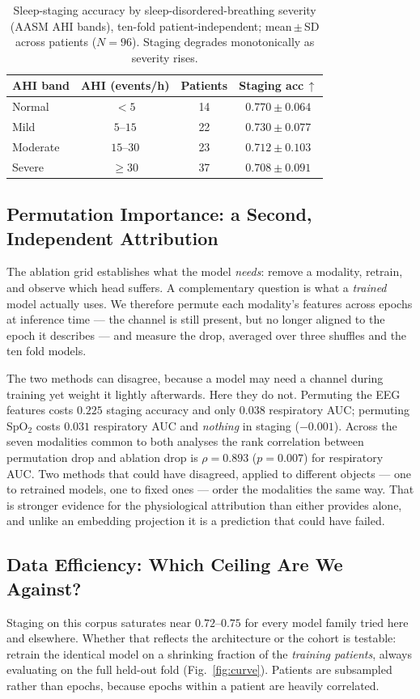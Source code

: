 \documentclass[journal]{IEEEtran}
\begin{document}
\begin{table}[t]
\caption{Sleep-staging accuracy by sleep-disordered-breathing severity (AASM AHI bands),
ten-fold patient-independent; mean\,$\pm$\,SD across patients ($N=96$). Staging degrades
monotonically as severity rises.}
\label{tab:severity}
\centering
\small
\begin{tabular}{lccc}
\toprule
AHI band & AHI (events/h) & Patients & Staging acc\,$\uparrow$ \\
\midrule
Normal   & $<5$       & 14 & $0.770 \pm 0.064$ \\
Mild     & $5$--$15$  & 22 & $0.730 \pm 0.077$ \\
Moderate & $15$--$30$ & 23 & $0.712 \pm 0.103$ \\
Severe   & $\geq 30$  & 37 & $0.708 \pm 0.091$ \\
\bottomrule
\end{tabular}
\end{table}

\subsection{Permutation Importance: a Second, Independent Attribution}
The ablation grid establishes what the model \emph{needs}: remove a modality, retrain, and
observe which head suffers. A complementary question is what a \emph{trained} model actually
uses. We therefore permute each modality's features across epochs at inference time --- the
channel is still present, but no longer aligned to the epoch it describes --- and measure the
drop, averaged over three shuffles and the ten fold models.

The two methods can disagree, because a model may need a channel during training yet weight it
lightly afterwards. Here they do not. Permuting the EEG features costs $0.225$ staging accuracy
and only $0.038$ respiratory AUC; permuting SpO$_2$ costs $0.031$ respiratory AUC and
\emph{nothing} in staging ($-0.001$). Across the seven modalities common to both analyses the
rank correlation between permutation drop and ablation drop is $\rho=0.893$ ($p=0.007$) for
respiratory AUC. Two methods that could have disagreed, applied to different objects --- one to
retrained models, one to fixed ones --- order the modalities the same way. That is stronger
evidence for the physiological attribution than either provides alone, and unlike an embedding
projection it is a prediction that could have failed.

\subsection{Data Efficiency: Which Ceiling Are We Against?}
\label{sec:curve}
Staging on this corpus saturates near $0.72$--$0.75$ for every model family tried here and
elsewhere. Whether that reflects the architecture or the cohort is testable: retrain the
identical model on a shrinking fraction of the \emph{training patients}, always evaluating on
the full held-out fold (Fig.~\ref{fig:curve}). Patients are subsampled rather than epochs,
because epochs within a patient are heavily correlated.
\end{document}
